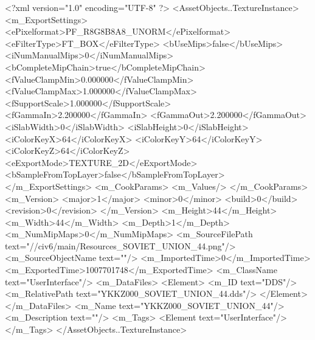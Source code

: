 <?xml version="1.0" encoding="UTF-8" ?>
<AssetObjects..TextureInstance>
	<m_ExportSettings>
		<ePixelformat>PF_R8G8B8A8_UNORM</ePixelformat>
		<eFilterType>FT_BOX</eFilterType>
		<bUseMips>false</bUseMips>
		<iNumManualMips>0</iNumManualMips>
		<bCompleteMipChain>true</bCompleteMipChain>
		<fValueClampMin>0.000000</fValueClampMin>
		<fValueClampMax>1.000000</fValueClampMax>
		<fSupportScale>1.000000</fSupportScale>
		<fGammaIn>2.200000</fGammaIn>
		<fGammaOut>2.200000</fGammaOut>
		<iSlabWidth>0</iSlabWidth>
		<iSlabHeight>0</iSlabHeight>
		<iColorKeyX>64</iColorKeyX>
		<iColorKeyY>64</iColorKeyY>
		<iColorKeyZ>64</iColorKeyZ>
		<eExportMode>TEXTURE_2D</eExportMode>
		<bSampleFromTopLayer>false</bSampleFromTopLayer>
	</m_ExportSettings>
	<m_CookParams>
		<m_Values/>
	</m_CookParams>
	<m_Version>
		<major>1</major>
		<minor>0</minor>
		<build>0</build>
		<revision>0</revision>
	</m_Version>
	<m_Height>44</m_Height>
	<m_Width>44</m_Width>
	<m_Depth>1</m_Depth>
	<m_NumMipMaps>0</m_NumMipMaps>
	<m_SourceFilePath text="//civ6/main/Resources_SOVIET_UNION_44.png"/>
	<m_SourceObjectName text=""/>
	<m_ImportedTime>0</m_ImportedTime>
	<m_ExportedTime>1007701748</m_ExportedTime>
	<m_ClassName text="UserInterface"/>
	<m_DataFiles>
		<Element>
			<m_ID text="DDS"/>
			<m_RelativePath text="YKKZ000_SOVIET_UNION_44.dds"/>
		</Element>
	</m_DataFiles>
	<m_Name text="YKKZ000_SOVIET_UNION_44"/>
	<m_Description text=""/>
	<m_Tags>
		<Element text="UserInterface"/>
	</m_Tags>
</AssetObjects..TextureInstance>


